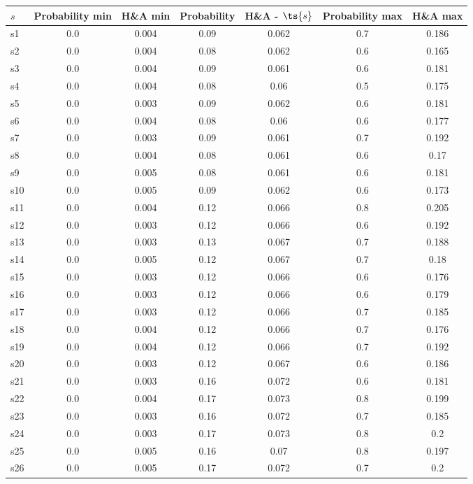 \documentclass{article}
\begin{document}
\noindent\begin{tabular}{|l|c|c|c|c|c|c|}
\hline
$s$& Probability min & H\&A min & Probability & H\&A - $\ts{s}$ & Probability max & H\&A max\\
\hline
s1 &0.0 & 0.004 & 0.09 & 0.062 & 0.7 & 0.186\\
\hline
s2 &0.0 & 0.004 & 0.08 & 0.062 & 0.6 & 0.165\\
\hline
s3 &0.0 & 0.004 & 0.09 & 0.061 & 0.6 & 0.181\\
\hline
s4 &0.0 & 0.004 & 0.08 & 0.06 & 0.5 & 0.175\\
\hline
s5 &0.0 & 0.003 & 0.09 & 0.062 & 0.6 & 0.181\\
\hline
s6 &0.0 & 0.004 & 0.08 & 0.06 & 0.6 & 0.177\\
\hline
s7 &0.0 & 0.003 & 0.09 & 0.061 & 0.7 & 0.192\\
\hline
s8 &0.0 & 0.004 & 0.08 & 0.061 & 0.6 & 0.17\\
\hline
s9 &0.0 & 0.005 & 0.08 & 0.061 & 0.6 & 0.181\\
\hline
s10 &0.0 & 0.005 & 0.09 & 0.062 & 0.6 & 0.173\\
\hline
s11 &0.0 & 0.004 & 0.12 & 0.066 & 0.8 & 0.205\\
\hline
s12 &0.0 & 0.003 & 0.12 & 0.066 & 0.6 & 0.192\\
\hline
s13 &0.0 & 0.003 & 0.13 & 0.067 & 0.7 & 0.188\\
\hline
s14 &0.0 & 0.005 & 0.12 & 0.067 & 0.7 & 0.18\\
\hline
s15 &0.0 & 0.003 & 0.12 & 0.066 & 0.6 & 0.176\\
\hline
s16 &0.0 & 0.003 & 0.12 & 0.066 & 0.6 & 0.179\\
\hline
s17 &0.0 & 0.003 & 0.12 & 0.066 & 0.7 & 0.185\\
\hline
s18 &0.0 & 0.004 & 0.12 & 0.066 & 0.7 & 0.176\\
\hline
s19 &0.0 & 0.004 & 0.12 & 0.066 & 0.7 & 0.192\\
\hline
s20 &0.0 & 0.003 & 0.12 & 0.067 & 0.6 & 0.186\\
\hline
s21 &0.0 & 0.003 & 0.16 & 0.072 & 0.6 & 0.181\\
\hline
s22 &0.0 & 0.004 & 0.17 & 0.073 & 0.8 & 0.199\\
\hline
s23 &0.0 & 0.003 & 0.16 & 0.072 & 0.7 & 0.185\\
\hline
s24 &0.0 & 0.003 & 0.17 & 0.073 & 0.8 & 0.2\\
\hline
s25 &0.0 & 0.005 & 0.16 & 0.07 & 0.8 & 0.197\\
\hline
s26 &0.0 & 0.005 & 0.17 & 0.072 & 0.7 & 0.2\\

\end{tabular}
\end{document}
